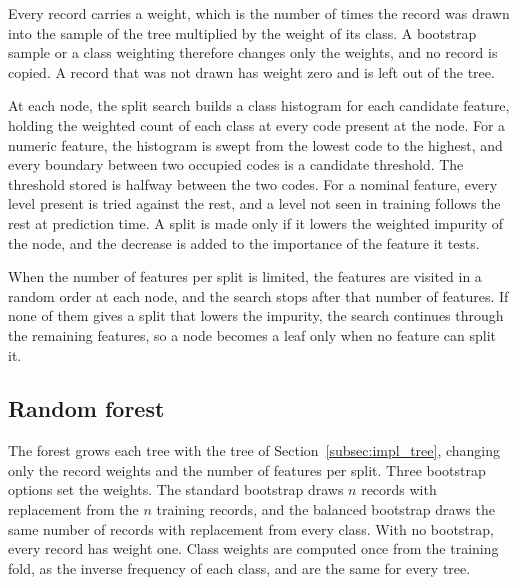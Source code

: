 \documentclass[conference,10pt]{IEEEtran}
\begin{document}
Every record carries a weight, which is the number of times the record was
drawn into the sample of the tree multiplied by the weight of its class. A
bootstrap sample or a class weighting therefore changes only the weights,
and no record is copied. A record that was not drawn has weight zero and is
left out of the tree.

At each node, the split search builds a class histogram for each candidate
feature, holding the weighted count of each class at every code present at
the node. For a numeric feature, the histogram is swept from the lowest code
to the highest, and every boundary between two occupied codes is a
candidate threshold. The threshold stored is halfway between the two codes.
For a nominal feature, every level present is tried against the rest, and a
level not seen in training follows the rest at prediction time. A split is
made only if it lowers the weighted impurity of the node, and the decrease
is added to the importance of the feature it tests. 

When the number of features per split is limited, the features are visited
in a random order at each node, and the search stops after that number of
features. If none of them gives a split that lowers the impurity, the search continues through the remaining features, so a node becomes a
leaf only when no feature can split it.

\subsection{Random forest}
\label{subsec:impl_forest}

The forest grows each tree with the tree of
Section~\ref{subsec:impl_tree}, changing only the record weights and the
number of features per split. Three bootstrap options set the weights. The
standard bootstrap draws $n$ records with replacement from the $n$ training
records, and the balanced bootstrap draws the same number of records with
replacement from every class. With no bootstrap, every record has weight
one. Class weights are computed once from the training fold, as the inverse
frequency of each class, and are the same for every tree.
\end{document}
